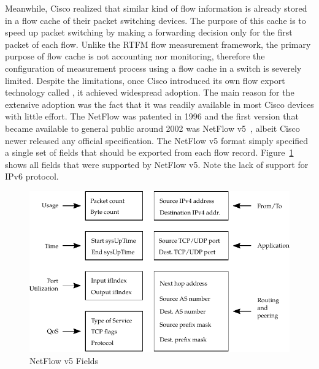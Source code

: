 Meanwhile, Cisco realized that similar kind of flow information is already stored in a flow cache of their packet switching devices. The purpose of this cache is to speed up packet switching by making a forwarding decision only for the first packet of each flow. Unlike the RTFM flow measurement framework, the primary purpose of flow cache is not accounting nor monitoring, therefore the configuration of measurement process using a flow cache in a switch is severely limited. Despite the limitations, once Cisco introduced its own flow export technology called , it achieved widespread adoption. The main reason for the extensive adoption was the fact that it was readily available in most Cisco devices with little effort. The NetFlow was patented in 1996 and the first version that became available to general public around 2002 was NetFlow v5~\cite{CiscoSystems-2007-NetFlow}, albeit Cisco newer released any official specification. The NetFlow v5 format simply specified a single set of fields that should be exported from each flow record. Figure~\ref{fig:nf5-fields} shows all fields that were supported by NetFlow v5. Note the lack of support for IPv6 protocol.

\begin{figure}[t!]
  \begin{center}
    \includegraphics[width=\textwidth]{figures/nf5-fields}
  \end{center}
  \caption{NetFlow v5 Fields}
  \label{fig:nf5-fields}
\end{figure}

